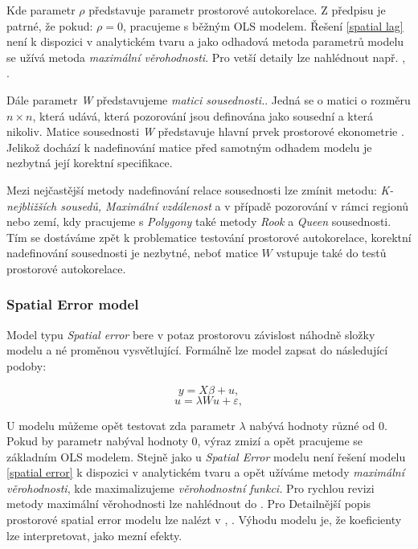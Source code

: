 \documentclass[11pt, a4paper]{article}
\begin{document}
Kde parametr \textit{$\rho$} představuje parametr prostorové autokorelace. Z předpisu je patrné, že pokud: \textit{$\rho = 0$}, pracujeme s běžným OLS modelem. Řešení \ref{spatial lag} není k dispozici v analytickém tvaru a jako odhadová metoda parametrů modelu se užívá metoda \textit{maximální věrohodnosti}. Pro vetší detaily lze nahlédnout např. \cite{lesage2008introduction}, \cite{formanek2019spatial}.

Dále parametr \textit{W} představujeme \textit{matici sousednosti.}. Jedná se o matici o rozměru \textit{$n \times n$}, která udává, která pozorování jsou definována jako sousední a která nikoliv. Matice sousednosti \textit{W} představuje hlavní prvek prostorové ekonometrie \cite{lesage2008introduction}. Jelikož dochází k nadefinování matice před samotným odhadem modelu je nezbytná její korektní specifikace. 

Mezi nejčastější metody nadefinování relace sousednosti lze zmínit metodu: \textit{K-nejbližších sousedů, Maximální vzdálenost} a v případě pozorování v rámci regionů nebo zemí, kdy pracujeme s \textit{Polygony} také metody \textit{Rook} a \textit{Queen} sousednosti. Tím se dostáváme zpět k problematice testování prostorové autokorelace, korektní nadefinování sousednosti je nezbytné, neboť matice \textit{$W$} vstupuje také do testů prostorové autokorelace.


\subsubsection{Spatial Error model}
Model typu \textit{Spatial error} bere v potaz prostorovu závislost náhodně složky modelu a né proměnou vysvětlující. Formálně lze model zapsat do následující podoby:

\begin{equation} \label{spatial error}
    y = X\beta + u, 
\end{equation}
\begin{equation*}
        u = \lambda W u + \varepsilon,
\end{equation*}

U modelu můžeme opět testovat zda parametr \textit{$\lambda$} nabývá hodnoty různé od $0$. Pokud by parametr nabýval hodnoty $0$, výraz zmizí a opět pracujeme se základním OLS modelem. Stejně jako u \textit{Spatial Error} modelu není řešení modelu \ref{spatial error} k dispozici v analytickém tvaru a opět užíváme metody \textit{maximální věrohodnosti}, kde maximalizujeme \textit{věrohodnostní funkci.} Pro rychlou revizi metody maximální věrohodnosti lze nahlédnout do \cite{wooldridge2016introductory-citovat_kapitolu}. Pro Detailnější popis prostorové spatial error modelu lze nalézt v  \cite{james2013introduction}, \cite{formanek2019spatial}. Výhodu modelu je, že koeficienty lze interpretovat, jako mezní efekty.
\end{document}
